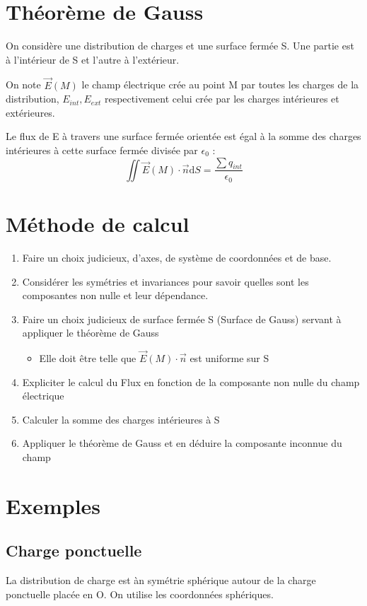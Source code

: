 \documentclass[french]{yLectureNote}
\renewcommand{\vec}{\overrightarrow}
\newcommand{\dd}{\mathrm{d}}
\newcommand{\E}{\vec{E}(M)}
\begin{document}
\section{Théorème de Gauss}
On considère une distribution de charges et une surface fermée S. Une partie est à l'intérieur de S et l'autre à l'extérieur.

On note \(\E\) le champ électrique crée au point M par toutes les charges de la distribution, \(E_{int}, E_{ext}\) respectivement celui crée par les charges intérieures et extérieures.

\begin{theorem}
Le flux de E à travers une surface fermée orientée est égal à la somme des charges intérieures à cette surface fermée divisée par \(\epsilon_0\) :
\[\iint \E\cdot \vec{n}\dd S = \frac{\sum q_{int}}{\epsilon_0}\]
\end{theorem}
\section{Méthode de calcul}
\begin{enumerate}
 \item Faire un choix judicieux, d'axes, de système de coordonnées et de base.
 \item Considérer les symétries et invariances pour savoir quelles sont les composantes non nulle et leur dépendance.
 \item Faire un choix judicieux de surface fermée S (Surface de Gauss) servant à appliquer le théorème de Gauss
 \begin{itemize}
  \item Elle doit \^etre telle que \(\E\cdot \vec{n}\) est uniforme sur S
 \end{itemize}
\item Expliciter le calcul du Flux en fonction de la composante non nulle du champ électrique
\item Calculer la somme des charges intérieures à S
\item Appliquer le théorème de Gauss et en déduire la composante inconnue du champ
\end{enumerate}
\section{Exemples}
\subsection{Charge ponctuelle}
La distribution de charge est àn symétrie sphérique autour de la charge ponctuelle placée en O. On utilise les coordonnées sphériques.
\end{document}
